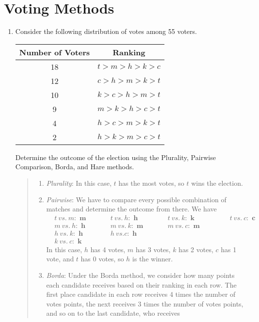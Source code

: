\documentclass{hw}
\begin{document}
\newpage
\section{Voting Methods}
\begin{enumerate}
\item Consider the following distribution of votes among 55 voters.\\
\begin{center}
\begin{tabular}{c | c}
Number of Voters & Ranking\\
\hline
18 & $t>m>h>k>c$\\
\hline
12 & $c>h>m>k>t$\\
\hline
10 & $k>c>h>m>t$\\
\hline
9 & $m>k>h>c>t$\\
\hline
4 & $h>c>m>k>t$\\
\hline
2 & $h>k>m>c>t$
\end{tabular}
\end{center}
Determine the outcome of the election using the Plurality, Pairwise Comparison, Borda, and Hare methods.
\begin{quote}
\begin{enumerate}
\item \textit{Plurality}: In this case, $t$ has the most votes, so $t$ wins the election.\\
\item \textit{Pairwise}: We have to compare every possible combination of matches and determine the
outcome from there. We have
\begin{align*}
&t\ vs.\ m:\textbf{ m} \qquad &&t\ vs.\ h:\textbf{ h} \qquad &&&t\ vs.\ k:\textbf{ k} \qquad &&&&t\ vs.\ c: \textbf{ c}\\
&m\ vs.\ h:\textbf{ h}  &&m\ vs.\ k:\textbf{ m}  &&&m\ vs.\ c: \textbf{ m} &&&&\\
&h\ vs.\ k:\textbf{ h}  &&h\ vs. c:\textbf{ h} &&& &&&&\\
&k\ vs.\ c:\textbf{ k} && &&& &&&&
\end{align*}
In this case, $h$ has 4 votes, $m$ has 3 votes, $k$ has 2 votes, $c$ has 1 vote, and $t$ has 0 votes,
so $h$ is the winner.\\
\item \textit{Borda}: Under the Borda method, we consider how many points each candidate receives based
on their ranking in each row. The first place candidate in each row receives 4 times the number of votes
points, the next receives 3 times the number of votes points, and so on to the last candidate, who receives

\end{enumerate}
\end{quote}
\end{enumerate}
\end{document}
